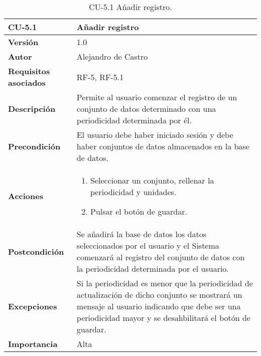\begin{table}[p]
	\centering
	\begin{tabularx}{\linewidth}{ p{} p{} }
		\toprule
		\textbf{CU-5.1}    & \textbf{Añadir registro}\\
		\toprule
		\textbf{Versión}              & 1.0    \\
		\textbf{Autor}                & {Alejandro de Castro} \\
		\textbf{Requisitos asociados} & RF-5, RF-5.1 \\
		\textbf{Descripción}          & Permite al usuario comenzar el registro de un conjunto de datos determinado con una periodicidad determinada por él. \\
		\textbf{Precondición}         & El usuario debe haber iniciado sesión y debe haber conjuntos de datos almacenados en la base de datos. \\
        \textbf{Acciones}             &
		\begin{enumerate}
			\def\labelenumi{\arabic{enumi}.}
			\tightlist
			\item Seleccionar un conjunto, rellenar la periodicidad y unidades.
			\item Pulsar el botón de guardar.
		\end{enumerate}\\ 
		\textbf{Postcondición}        & Se añadirá la base de datos los datos seleccionados por el usuario y el Sistema comenzará al registro del conjunto de datos con la periodicidad determinada por el usuario. \\
		\textbf{Excepciones}          & Si la periodicidad es menor que la periodicidad de actualización de dicho conjunto se mostrará un mensaje al usuario indicando que debe ser una periodicidad mayor y se desahbilitará el botón de guardar. \\
		\textbf{Importancia}          & Alta \\
		\bottomrule
	\end{tabularx}
	\caption{CU-5.1 Añadir registro.}
\end{table}

